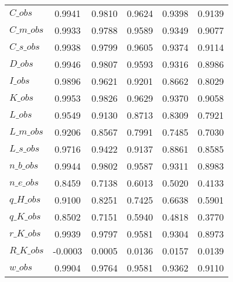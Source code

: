 \begin{center}
\begin{longtable}{lccccc}
$C\_obs                     $	 & 	        0.9941	 & 	        0.9810	 & 	        0.9624	 & 	        0.9398	 & 	        0.9139 \\ 
$C\_m\_obs                  $	 & 	        0.9933	 & 	        0.9788	 & 	        0.9589	 & 	        0.9349	 & 	        0.9077 \\ 
$C\_s\_obs                  $	 & 	        0.9938	 & 	        0.9799	 & 	        0.9605	 & 	        0.9374	 & 	        0.9114 \\ 
$D\_obs                     $	 & 	        0.9946	 & 	        0.9807	 & 	        0.9593	 & 	        0.9316	 & 	        0.8986 \\ 
$I\_obs                     $	 & 	        0.9896	 & 	        0.9621	 & 	        0.9201	 & 	        0.8662	 & 	        0.8029 \\ 
$K\_obs                     $	 & 	        0.9953	 & 	        0.9826	 & 	        0.9629	 & 	        0.9370	 & 	        0.9058 \\ 
$L\_obs                     $	 & 	        0.9549	 & 	        0.9130	 & 	        0.8713	 & 	        0.8309	 & 	        0.7921 \\ 
$L\_m\_obs                  $	 & 	        0.9206	 & 	        0.8567	 & 	        0.7991	 & 	        0.7485	 & 	        0.7030 \\ 
$L\_s\_obs                  $	 & 	        0.9716	 & 	        0.9422	 & 	        0.9137	 & 	        0.8861	 & 	        0.8585 \\ 
$n\_b\_obs                  $	 & 	        0.9944	 & 	        0.9802	 & 	        0.9587	 & 	        0.9311	 & 	        0.8983 \\ 
$n\_e\_obs                  $	 & 	        0.8459	 & 	        0.7138	 & 	        0.6013	 & 	        0.5020	 & 	        0.4133 \\ 
$q\_H\_obs                  $	 & 	        0.9100	 & 	        0.8251	 & 	        0.7425	 & 	        0.6638	 & 	        0.5901 \\ 
$q\_K\_obs                  $	 & 	        0.8502	 & 	        0.7151	 & 	        0.5940	 & 	        0.4818	 & 	        0.3770 \\ 
$r\_K\_obs                  $	 & 	        0.9939	 & 	        0.9797	 & 	        0.9581	 & 	        0.9304	 & 	        0.8973 \\ 
$R\_K\_obs                  $	 & 	       -0.0003	 & 	        0.0005	 & 	        0.0136	 & 	        0.0157	 & 	        0.0139 \\ 
$w\_obs                     $	 & 	        0.9904	 & 	        0.9764	 & 	        0.9581	 & 	        0.9362	 & 	        0.9110 \\ 

\end{longtable}
\end{center}
